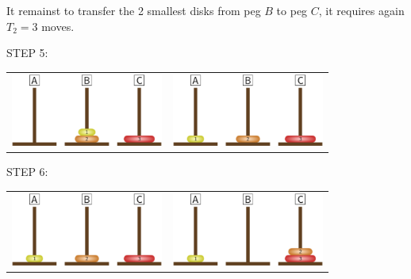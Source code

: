It remainst to transfer the 2 smallest disks from peg $B$ to peg $C$, it requires again $T_2=3$ moves.

STEP 5:
\begin{center}
\begin{tabular}{l|r}
\includegraphics[width=50mm]{./H35-1}
&
\includegraphics[width=50mm]{./H36-1}
\end{tabular}
\end{center}

STEP 6:
\begin{center}
\begin{tabular}{l|r}
\includegraphics[width=50mm]{./H36-1}
&
\includegraphics[width=50mm]{./H37-1}
\end{tabular}
\end{center}

